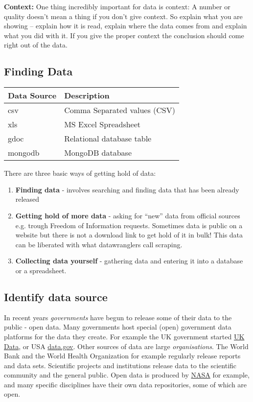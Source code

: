 \documentclass[letterpaper,10pt,oneside]{sphinxmanual}
\begin{document}
\textbf{Context:} One thing incredibly important for data is context: A number or quality doesn’t mean a thing if you don’t give context.
So explain what you are showing – explain how it is read, explain where the data comes from and explain what you did with it.
If you give the proper context the conclusion should come right out of the data.


\subsection{Finding Data}
\label{introduction:finding-data}
\begin{tabulary}{\linewidth}{|L|L|}
\hline
\textsf{\relax 
\textbf{Data Source}
} & \textsf{\relax 
\textbf{Description}
}\\
\hline
csv
 & 
Comma Separated values (CSV)
\\
\hline
xls
 & 
MS Excel Spreadsheet
\\
\hline
gdoc
 & 
Relational database table
\\
\hline
mongodb
 & 
MongoDB database
\\
\hline\end{tabulary}


There are three basic ways of getting hold of data:
\begin{enumerate}
\item {} 
\textbf{Finding data} - involves searching and finding data that has been already released

\item {} 
\textbf{Getting hold of more data} - asking for “new” data from official sources e.g. trough
Freedom of Information requests. Sometimes data is public on a website but there is not
a download link to get hold of it in bulk! This data can be liberated with what
datawranglers call scraping.

\item {} 
\textbf{Collecting data yourself} - gathering data and entering it into a database or a
spreadsheet.

\end{enumerate}


\subsection{Identify data source}
\label{introduction:identify-data-source}
In recent years \emph{governments} have begun to release some of their data to the public - open data.
Many governments host special (open) government data platforms for the data they create.
For example the UK government started \href{https://www.ukdataservice.ac.uk}{UK Data}, or USA \href{http://www.data.gov}{data.gov}.
Other sources of data are large \emph{organisations}.
The World Bank and the World Health Organization for example regularly release reports and data sets.
Scientific projects and institutions release data to the scientific community and the general public.
Open data is produced by \href{https://www.nasa.gov}{NASA} for example, and many specific disciplines have their own data repositories, some of which are open.
\end{document}
